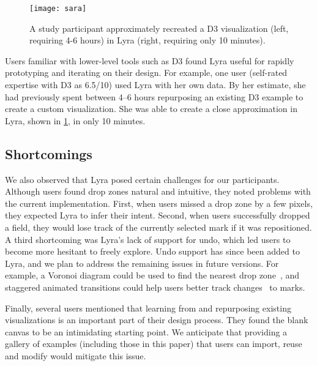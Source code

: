 \begin{figure}[b!]
\centering
  \texttt{[image: sara]}
  \caption{A study participant approximately recreated a D3 visualization (left,
  requiring 4-6 hours) in Lyra (right, requiring only 10 minutes).}
  \label{fig:lyra:sara_waitlists}
\end{figure}

Users familiar with lower-level tools such as D3 found Lyra useful for rapidly
prototyping and iterating on their design. For example, one user (self-rated
expertise with D3 as 6.5/10) used Lyra with her own data. By her estimate, she
had previously spent between 4--6 hours repurposing an existing D3 example to
create a custom visualization. She was able to create a close approximation in
Lyra, shown in \cref{fig:lyra:sara_waitlists}, in only 10 minutes.

\subsection{Shortcomings}

We also observed that Lyra posed certain challenges for our participants.
Although users found drop zones natural and intuitive, they noted problems with
the current implementation. First, when users missed a drop zone by a few
pixels, they expected Lyra to infer their intent. Second, when users
successfully dropped a field, they would lose track of the currently selected
mark if it was repositioned. A third shortcoming was Lyra's lack of support for
undo, which led users to become more hesitant to freely explore. Undo support
has since been added to Lyra, and we plan to address the remaining issues in
future versions. For example, a Voronoi diagram could be used to find the
nearest drop zone~\cite{grossman:bubble}, and staggered animated transitions
could help users better track changes~\cite{heer:animated} to marks.

Finally, several users mentioned that learning from and repurposing existing
visualizations is an important part of their design process. They found the
blank canvas to be an intimidating starting point. We anticipate that
providing a gallery of examples (including those in this paper) that users can
import, reuse and modify would mitigate this issue.
